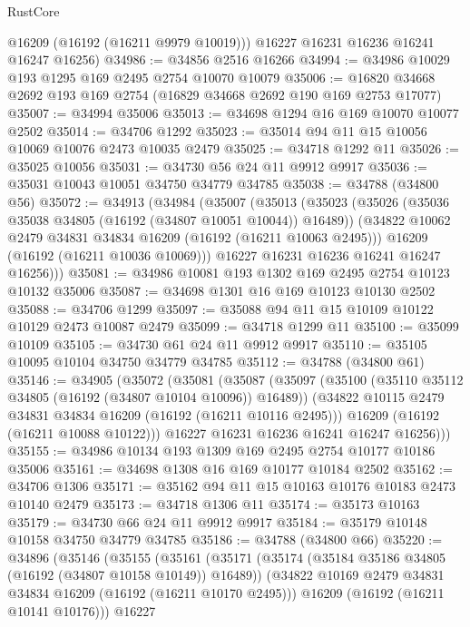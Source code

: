 \begin{lexlean}{RustCore}
\begin{coremodule}
        @16209
        (@16192 (@16211 @9979 @10019)))
      @16227
      @16231
      @16236
      @16241
      @16247
      @16256)
@34986 := @34856 @2516 @16266
@34994 := @34986 @10029 @193 @1295 @169 @2495 @2754 @10070 @10079
@35006 := @16820 @34668 @2692 @193 @169 @2754 (@16829 @34668 @2692 @190 @169 @2753 @17077)
@35007 := @34994 @35006
@35013 := @34698 @1294 @16 @169 @10070 @10077 @2502
@35014 := @34706 @1292
@35023 := @35014 @94 @11 @15 @10056 @10069 @10076 @2473 @10035 @2479
@35025 := @34718 @1292 @11
@35026 := @35025 @10056
@35031 := @34730 @56 @24 @11 @9912 @9917
@35036 := @35031 @10043 @10051 @34750 @34779 @34785
@35038 := @34788 (@34800 @56)
@35072 := @34913
    (@34984
      (@35007
        (@35013
          (@35023
            (@35026 (@35036 @35038 @34805 (@16192 (@34807 @10051 @10044)) @16489))
            (@34822 @10062 @2479 @34831 @34834 @16209 (@16192 (@16211 @10063 @2495)))
            @16209
            (@16192 (@16211 @10036 @10069)))
          @16227
          @16231
          @16236
          @16241
          @16247
          @16256)))
@35081 := @34986 @10081 @193 @1302 @169 @2495 @2754 @10123 @10132 @35006
@35087 := @34698 @1301 @16 @169 @10123 @10130 @2502
@35088 := @34706 @1299
@35097 := @35088 @94 @11 @15 @10109 @10122 @10129 @2473 @10087 @2479
@35099 := @34718 @1299 @11
@35100 := @35099 @10109
@35105 := @34730 @61 @24 @11 @9912 @9917
@35110 := @35105 @10095 @10104 @34750 @34779 @34785
@35112 := @34788 (@34800 @61)
@35146 := @34905
    (@35072
      (@35081
        (@35087
          (@35097
            (@35100 (@35110 @35112 @34805 (@16192 (@34807 @10104 @10096)) @16489))
            (@34822 @10115 @2479 @34831 @34834 @16209 (@16192 (@16211 @10116 @2495)))
            @16209
            (@16192 (@16211 @10088 @10122)))
          @16227
          @16231
          @16236
          @16241
          @16247
          @16256)))
@35155 := @34986 @10134 @193 @1309 @169 @2495 @2754 @10177 @10186 @35006
@35161 := @34698 @1308 @16 @169 @10177 @10184 @2502
@35162 := @34706 @1306
@35171 := @35162 @94 @11 @15 @10163 @10176 @10183 @2473 @10140 @2479
@35173 := @34718 @1306 @11
@35174 := @35173 @10163
@35179 := @34730 @66 @24 @11 @9912 @9917
@35184 := @35179 @10148 @10158 @34750 @34779 @34785
@35186 := @34788 (@34800 @66)
@35220 := @34896
    (@35146
      (@35155
        (@35161
          (@35171
            (@35174 (@35184 @35186 @34805 (@16192 (@34807 @10158 @10149)) @16489))
            (@34822 @10169 @2479 @34831 @34834 @16209 (@16192 (@16211 @10170 @2495)))
            @16209
            (@16192 (@16211 @10141 @10176)))
          @16227

\end{coremodule}
\end{lexlean}
